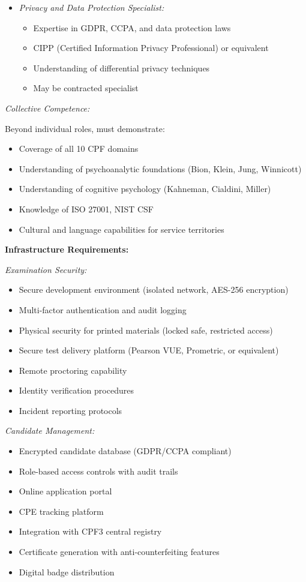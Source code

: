 \documentclass[11pt,a4paper]{article}
\begin{document}
\begin{itemize}
\item \textit{Privacy and Data Protection Specialist:}
\begin{itemize}
\item Expertise in GDPR, CCPA, and data protection laws
\item CIPP (Certified Information Privacy Professional) or equivalent
\item Understanding of differential privacy techniques
\item May be contracted specialist
\end{itemize}
\end{itemize}

\textit{Collective Competence:}

Beyond individual roles, must demonstrate:
\begin{itemize}
\item Coverage of all 10 CPF domains
\item Understanding of psychoanalytic foundations (Bion, Klein, Jung, Winnicott)
\item Understanding of cognitive psychology (Kahneman, Cialdini, Miller)
\item Knowledge of ISO 27001, NIST CSF
\item Cultural and language capabilities for service territories
\end{itemize}

\textbf{Infrastructure Requirements:}

\textit{Examination Security:}
\begin{itemize}
\item Secure development environment (isolated network, AES-256 encryption)
\item Multi-factor authentication and audit logging
\item Physical security for printed materials (locked safe, restricted access)
\item Secure test delivery platform (Pearson VUE, Prometric, or equivalent)
\item Remote proctoring capability
\item Identity verification procedures
\item Incident reporting protocols
\end{itemize}

\textit{Candidate Management:}
\begin{itemize}
\item Encrypted candidate database (GDPR/CCPA compliant)
\item Role-based access controls with audit trails
\item Online application portal
\item CPE tracking platform
\item Integration with CPF3 central registry
\item Certificate generation with anti-counterfeiting features
\item Digital badge distribution
\end{itemize}
\end{document}
